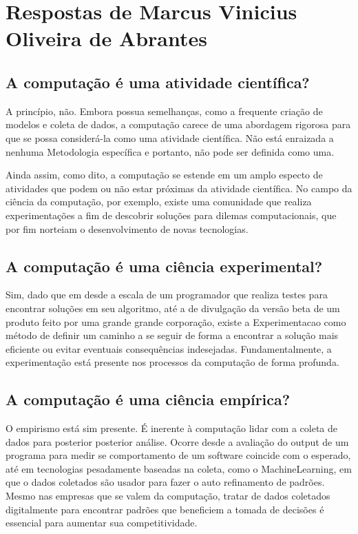 \section{Respostas de Marcus Vinicius Oliveira de Abrantes}

\subsection{A computação é uma atividade científica?}
 A princípio, não. Embora possua semelhanças, como a frequente criação de modelos e coleta de dados, a computação carece de uma abordagem rigorosa para que se possa considerá-la como uma atividade científica. Não está enraizada a nenhuma \gls{Metodologia} específica e portanto, não pode ser definida como uma.
 
 Ainda assim, como dito, a computação se estende em um amplo especto de atividades que podem ou não estar próximas da atividade científica. No campo da ciência da computação, por exemplo, existe uma comunidade que realiza experimentações a fim de descobrir soluções para dilemas computacionais, que por fim norteiam o desenvolvimento de novas tecnologias.

\subsection{A computação é uma ciência experimental?}
Sim, dado que em desde a escala de um programador que realiza testes para encontrar soluções em seu algoritmo, até  a de divulgação da versão beta de um produto feito por uma grande grande corporação, existe a \gls{Experimentacao} como método de definir um caminho a se seguir de forma a encontrar a solução mais eficiente ou evitar eventuais consequências indesejadas. Fundamentalmente, a experimentação está presente nos processos da computação de forma profunda.
    
\subsection{A computação é uma ciência empírica?}
O empirismo está sim presente. É inerente à computação lidar com a coleta de dados para posterior posterior análise. Ocorre desde a avaliação do output de um programa para medir se comportamento de um software coincide com o esperado, até  em tecnologias pesadamente baseadas na coleta, como o \gls{MachineLearning}, em que o dados coletados são usador para fazer o auto refinamento de padrões. Mesmo nas empresas que se valem da computação, tratar de dados coletados digitalmente para encontrar padrões que beneficiem a tomada de decisões é essencial para aumentar sua competitividade.